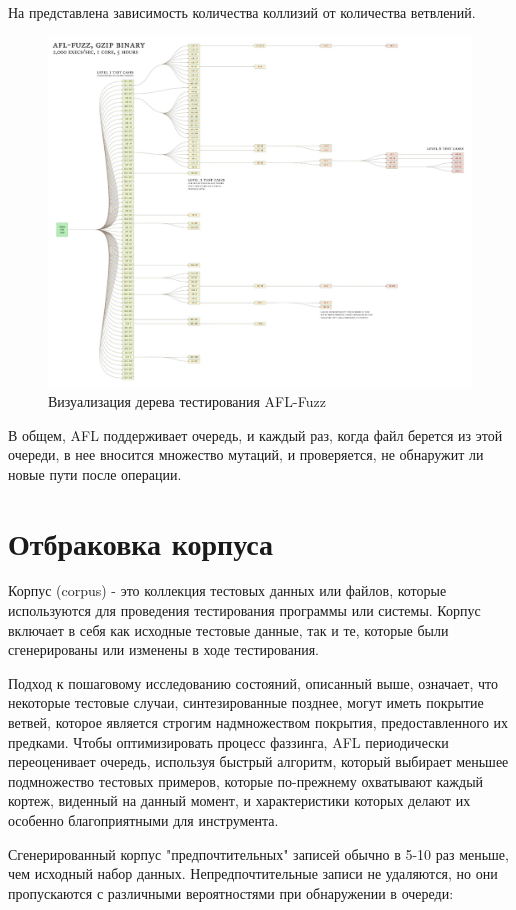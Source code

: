 На  представлена зависимость количества коллизий от количества ветвлений.

\begin{figure}[ht] 
	\center
	\includegraphics [scale=1] {my_folder/images/test_gen}
	\caption{Визуализация дерева тестирования AFL-Fuzz} 
	\label{fig:test-generation-ch3}  
\end{figure}
\par
В общем, AFL поддерживает очередь, и каждый раз, когда файл берется из этой очереди, в нее вносится множество мутаций, и проверяется, не обнаружит ли новые пути после операции.

\section{Отбраковка корпуса} \label{ch3:sec5}
Корпус (corpus) - это коллекция тестовых данных или файлов, которые используются для проведения тестирования программы или системы. Корпус включает в себя как исходные тестовые данные, так и те, которые были сгенерированы или изменены в ходе тестирования.
\par
Подход к пошаговому исследованию состояний, описанный выше, означает, что некоторые тестовые случаи, синтезированные позднее, могут иметь покрытие ветвей, которое является строгим надмножеством покрытия, предоставленного их предками. Чтобы оптимизировать процесс фаззинга, AFL периодически переоценивает очередь, используя быстрый алгоритм, который выбирает меньшее подмножество тестовых примеров, которые по-прежнему охватывают каждый кортеж, виденный на данный момент, и характеристики которых делают их особенно благоприятными для инструмента.
\par 
Сгенерированный корпус "предпочтительных" записей обычно в 5-10 раз меньше, чем исходный набор данных. Непредпочтительные записи не удаляются, но они пропускаются с различными вероятностями при обнаружении в очереди:

